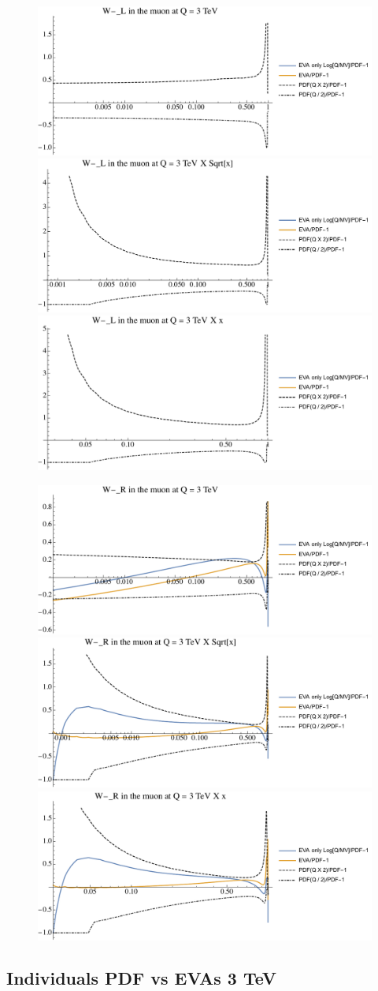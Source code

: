 \documentclass[a4paper,11pt]{article}
\begin{document}
\begin{figure}[ht]
\includegraphics[width=0.4\linewidth]{PlotPDFs/ratios/3TeV/W-_L_Q.pdf}
\includegraphics[width=0.4\linewidth]{PlotPDFs/ratios/3TeV/W-_L_Qsqrtx.pdf}
\includegraphics[width=0.4\linewidth]{PlotPDFs/ratios/3TeV/W-_L_Qx.pdf}
\end{figure}

\begin{figure}[ht]
\includegraphics[width=0.4\linewidth]{PlotPDFs/ratios/3TeV/W-_R_Q.pdf}
\includegraphics[width=0.4\linewidth]{PlotPDFs/ratios/3TeV/W-_R_Qsqrtx.pdf}
\includegraphics[width=0.4\linewidth]{PlotPDFs/ratios/3TeV/W-_R_Qx.pdf}
\end{figure}

\clearpage
\subsection{Individuals PDF vs EVAs 3 TeV}
\end{document}
